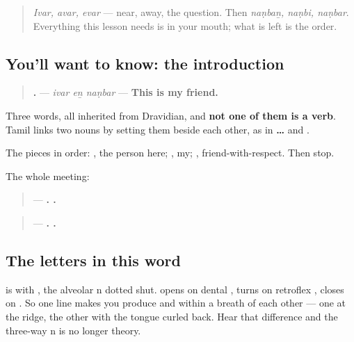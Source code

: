 \label{lesson:TA-C37-ivar-en-nanbar}



\begin{quote}
\emph{Ivar, avar, evar} — near, away, the question. Then \emph{naṇbaṉ, naṇbi, naṇbar}. Everything this lesson needs is in your mouth; what is left is the order.
\end{quote}

\subsection*{You'll want to know: the introduction}
\begin{quote}
\textbf{  .} — \emph{ivar eṉ naṇbar} — \textbf{This is my friend.}
\end{quote}

Three words, all inherited from Dravidian, and \textbf{not one of them is a verb}. Tamil links two nouns by setting them beside each other, as in \textbf{  …} and \textbf{ }.

The pieces in order: \textbf{}, the person here; \textbf{}, my; \textbf{}, friend-with-respect. Then stop.

The whole meeting:

\begin{quote}
— \textbf{.   .}
\end{quote}

\begin{quote}
— \textbf{.   .}
\end{quote}

\subsection*{The letters in this word}
\textbf{} is \textbf{} with \textbf{}, the alveolar n dotted shut. \textbf{} opens on dental \textbf{}, turns on retroflex \textbf{}, closes on \textbf{}. So one line makes you produce \textbf{} and \textbf{} within a breath of each other — one at the ridge, the other with the tongue curled back. Hear that difference and the three-way n is no longer theory.

